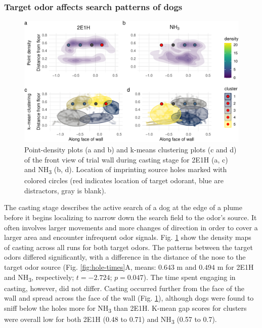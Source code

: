 \documentclass[
]{article}
\begin{document}
\hypertarget{target-odor-affects-search-patterns-of-dogs}{%
\subsubsection{Target odor affects search patterns of dogs}\label{target-odor-affects-search-patterns-of-dogs}}

\begin{figure}
\centering
\includegraphics{main-manuscript_files/figure-latex/frontwall-casting-1.pdf}
\caption{\label{fig:frontwall-casting}Point-density plots (a and b) and k-means clustering plots (c and d) of the front view of trial wall during casting stage for 2E1H (a, c) and NH\textsubscript{3} (b, d). Location of imprinting source holes marked with colored circles (red indicates location of target odorant, blue are distractors, gray is blank).}
\end{figure}

The casting stage describes the active search of a dog at the edge of a plume before it begins localizing to narrow down the search field to the odor's source. It often involves larger movements and more changes of direction in order to cover a larger area and encounter infrequent odor signals. Fig. \ref{fig:frontwall-casting} show the density maps of casting across all runs for both target odors. The patterns between the target odors differed significantly, with a difference in the distance of the nose to the target odor source (Fig. \ref{fig:hole-times}A, means: \(0.643\) m and \(0.494\) m for 2E1H and NH\textsubscript{3}, respectively; \(t = -2.724\); \(p = 0.047\)). The time spent engaging in casting, however, did not differ. Casting occurred further from the face of the wall and spread across the face of the wall (Fig. \ref{fig:frontwall-casting}), although dogs were found to sniff below the holes more for NH\textsubscript{3} than 2E1H. K-mean gap scores for clusters were overall low for both 2E1H (0.48 to 0.71) and NH\textsubscript{3} (0.57 to 0.7).
\end{document}
